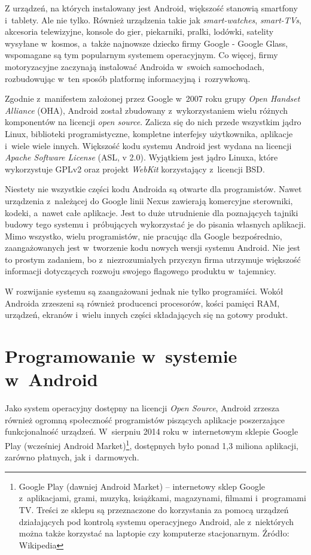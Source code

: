 Z urządzeń, na których instalowany jest Android, większość stanowią smartfony i~tablety. Ale nie tylko. Również urządzenia takie jak \textit{smart-watches}, \textit{smart-TVs}, akcesoria telewizyjne, konsole do gier, piekarniki, pralki, lodówki, satelity wysyłane w~kosmos, a~także najnowsze dziecko firmy Google - Google Glass, wspomagane są tym popularnym systemem operacyjnym. Co więcej, firmy motoryzacyjne zaczynają instalować Androida w~swoich samochodach, rozbudowując w~ten sposób platformę informacyjną i~rozrywkową.

Zgodnie z~manifestem założonej przez Google w~2007 roku grupy \textit{Open Handset Alliance} (OHA), Android został zbudowany z~wykorzystaniem wielu różnych komponentów na licencji \textit{open source}. Zalicza się do nich przede wszystkim jądro Linux, biblioteki programistyczne, kompletne interfejsy użytkownika, aplikacje i~wiele wiele innych. Większość kodu systemu Android jest wydana na licencji \textit{Apache Software License} (ASL, v 2.0). Wyjątkiem jest jądro Linuxa, które wykorzystuje GPLv2 oraz projekt \textit{WebKit} korzystający z~licencji BSD. 

Niestety nie wszystkie części kodu Androida są otwarte dla programistów. Nawet urządzenia z~należącej do Google linii Nexus zawierają komercyjne sterowniki, kodeki, a~nawet całe aplikacje. Jest to duże utrudnienie dla poznających tajniki budowy tego systemu i~próbujących wykorzystać je do pisania własnych aplikacji. Mimo wszystko, wielu programistów, nie pracując dla Google bezpośrednio, zaangażowanych jest w~tworzenie kodu nowych wersji systemu Android. Nie jest to prostym zadaniem, bo z~niezrozumiałych przyczyn firma utrzymuje większość informacji dotyczących rozwoju swojego flagowego produktu w~tajemnicy.

W rozwijanie systemu są zaangażowani jednak nie tylko programiści. Wokół Androida zrzeszeni są również producenci procesorów, kości pamięci RAM, urządzeń, ekranów i~wielu innych części składających się na gotowy produkt.

\section{Programowanie w~systemie w~Android}
Jako system operacyjny dostępny na licencji \textit{Open Source}, Android zrzesza również ogromną społeczność programistów piszących aplikacje poszerzające funkcjonalność urządzeń. W~sierpniu 2014 roku w~internetowym sklepie Google Play (wcześniej Android Market)\footnote{Google Play (dawniej Android Market) – internetowy sklep Google z~aplikacjami, grami, muzyką, książkami, magazynami, filmami i~programami TV. Treści ze sklepu są przeznaczone do korzystania za pomocą urządzeń działających pod kontrolą systemu operacyjnego Android, ale z~niektórych można także korzystać na laptopie czy komputerze stacjonarnym. Źródło: Wikipedia}, dostępnych było ponad 1,3 miliona aplikacji, zarówno płatnych, jak i~darmowych.

